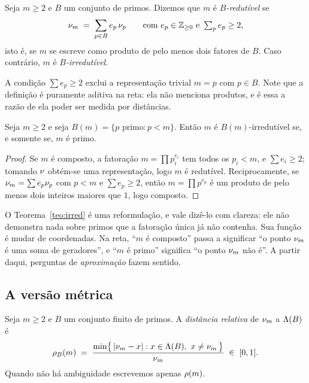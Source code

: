 \begin{definicao}\label{def:irredutivel}
Seja $m\ge2$ e $B$ um conjunto de primos. Dizemos que $m$ é \emph{$B$-redutível}
se
\[
  \nu_{m} \;=\; \sum_{p\in B} e_p \,\nu_{p}
  \qquad\text{com } e_p\in\mathbb{Z}_{\ge0}\ \text{e}\ \textstyle\sum_p e_p \ge 2 ,
\]
isto é, se $m$ se escreve como produto de pelo menos dois fatores de $B$.
Caso contrário, $m$ é \emph{$B$-irredutível}.
\end{definicao}

A condição $\sum e_p\ge2$ exclui a representação trivial $m=p$ com $p\in B$.
Note que a definição é puramente aditiva na reta: ela não menciona produtos, e é
essa a razão de ela poder ser medida por distâncias.

\begin{teorema}\label{teo:irred}
Seja $m\ge2$ e seja $B(m)=\{p \text{ primo} : p<m\}$. Então $m$ é
$B(m)$-irredutível se, e somente se, $m$ é primo.
\end{teorema}

\begin{proof}
Se $m$ é composto, a fatoração $m=\prod p_i^{e_i}$ tem todos os $p_i<m$, e
$\sum e_i\ge2$; tomando $\nu_{}$ obtém-se uma representação, logo $m$ é
redutível. Reciprocamente, se $\nu_{m}=\sum e_p\nu_{p}$ com $p<m$ e
$\sum e_p\ge2$, então $m=\prod p^{e_p}$ é um produto de pelo menos dois inteiros
maiores que $1$, logo composto.
\end{proof}

O Teorema~\ref{teo:irred} é uma reformulação, e vale dizê-lo com clareza: ele não
demonstra nada sobre primos que a fatoração única já não contenha. Sua função é
mudar de coordenadas. Na reta, ``$m$ é composto'' passa a significar ``o ponto
$\nu_{m}$ é uma soma de geradores'', e ``$m$ é primo'' significa ``o ponto
$\nu_{m}$ não é''. A partir daqui, perguntas de \emph{aproximação} fazem sentido.

\subsection{A versão métrica}

\begin{definicao}\label{def:rho}
Seja $m\ge2$ e $B$ um conjunto finito de primos. A \emph{distância relativa} de
$\nu_{m}$ a $\Lambda(B)$ é
\[
  \rho_B(m) \;=\;
  \frac{\min\bigl\{\,|\nu_{m} - x| : x\in\Lambda(B),\ x\neq \nu_{m}\,\bigr\}}{\nu_{m}}
  \;\in\;[0,1] .
\]
Quando não há ambiguidade escrevemos apenas $\rho(m)$.
\end{definicao}

